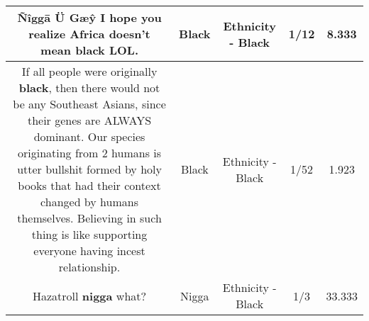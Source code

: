 \documentclass[11pt]{article}
\newlength\mylength
\begin{document}
\begin{center}
\begin{longtable}{|C{.65\mylength}|C{.30\mylength}|C{.12\mylength}|C{.12\mylength}|C{.12\mylength}|}
  \small Ñîggā Ü Gæŷ I hope you realize Africa doesn't mean \textbf{black} LOL.\normalsize   & Black & Ethnicity - Black & 1/12 & 8.333 \\  \hline
  \small If all people were originally \textbf{black}, then there would not be any Southeast Asians, since their genes are ALWAYS dominant. Our species originating from 2 humans is utter bullshit formed by holy books that had their context changed by humans themselves. Believing in such thing is like supporting everyone having incest relationship.\normalsize   & Black & Ethnicity - Black & 1/52 & 1.923 \\  \hline
  \small Hazatroll \textbf{nigga} what?\normalsize   & Nigga & Ethnicity - Black & 1/3 & 33.333 \\  \hline

\end{longtable}
\end{center}
\end{document}
